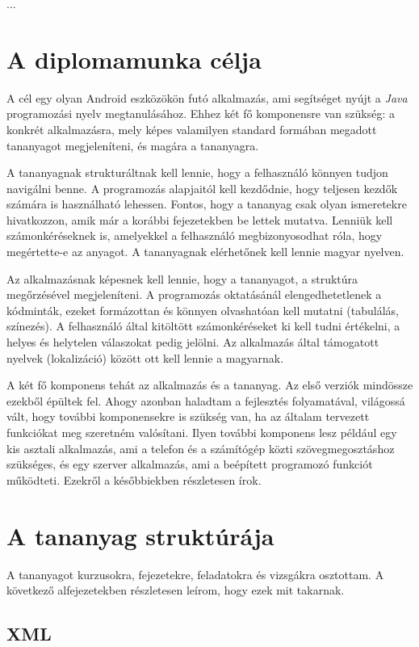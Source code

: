 \documentclass[12pt,a4paper]{article}
\begin{document}
	...

	\section{A diplomamunka célja}
	
	A cél egy olyan Android eszközökön futó alkalmazás, ami segítséget nyújt a \textit{Java} programozási nyelv megtanulásához. Ehhez két fő komponensre van szükség: a konkrét alkalmazásra, mely képes valamilyen standard formában megadott tananyagot megjeleníteni, és magára a tananyagra. 

	A tananyagnak strukturáltnak kell lennie, hogy a felhasználó könnyen tudjon navigálni benne. A programozás alapjaitól kell kezdődnie, hogy teljesen kezdők számára is használható lehessen. Fontos, hogy a tananyag csak olyan ismeretekre hivatkozzon, amik már a korábbi fejezetekben be lettek mutatva. Lenniük kell számonkéréseknek is, amelyekkel a felhasználó megbizonyosodhat róla, hogy megértette-e az anyagot. A tananyagnak elérhetőnek kell lennie magyar nyelven.
	
	Az alkalmazásnak képesnek kell lennie, hogy a tananyagot, a struktúra megőrzésével megjeleníteni. A programozás oktatásánál elengedhetetlenek a kódminták, ezeket formázottan és könnyen olvashatóan kell mutatni (tabulálás, színezés). A felhasználó által kitöltött számonkéréseket ki kell tudni értékelni, a helyes és helytelen válaszokat pedig jelölni. Az alkalmazás által támogatott nyelvek (lokalizáció) között ott kell lennie a magyarnak.
	
	A két fő komponens tehát az alkalmazás és a tananyag. Az első verziók mindössze ezekből épültek fel. Ahogy azonban haladtam a fejlesztés folyamatával, világossá vált, hogy további komponensekre is szükség van, ha az általam tervezett funkciókat meg szeretném valósítani. Ilyen további komponens lesz például egy kis asztali alkalmazás, ami a telefon és a számítógép közti szövegmegosztáshoz szükséges, és egy szerver alkalmazás, ami a beépített programozó funkciót működteti. Ezekről a későbbiekben részletesen írok. 
	
	\section{A tananyag struktúrája}  
	
	A tananyagot kurzusokra, fejezetekre, feladatokra és vizsgákra osztottam. A következő alfejezetekben részletesen leírom, hogy ezek mit takarnak.
		
	\subsection{XML}
	
\end{document}

